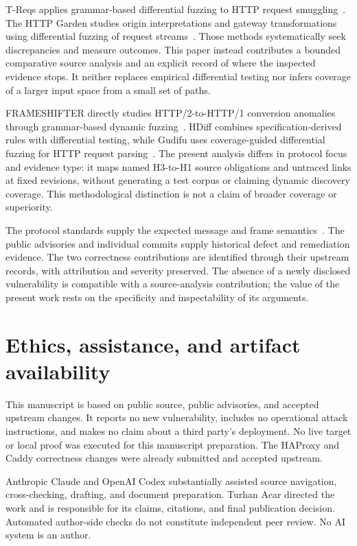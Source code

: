 \documentclass[11pt,letterpaper]{article}
\begin{document}
T-Reqs applies grammar-based differential fuzzing to HTTP request smuggling~\cite{treqs}. The HTTP Garden studies origin interpretations and gateway transformations using differential fuzzing of request streams~\cite{garden}. Those methods systematically seek discrepancies and measure outcomes. This paper instead contributes a bounded comparative source analysis and an explicit record of where the inspected evidence stops. It neither replaces empirical differential testing nor infers coverage of a larger input space from a small set of paths.

FRAMESHIFTER directly studies HTTP/2-to-HTTP/1 conversion anomalies through grammar-based dynamic fuzzing~\cite{frameshifter}. HDiff combines specification-derived rules with differential testing, while Gudifu uses coverage-guided differential fuzzing for HTTP request parsing~\cite{hdiff,gudifu}. The present analysis differs in protocol focus and evidence type: it maps named H3-to-H1 source obligations and untraced links at fixed revisions, without generating a test corpus or claiming dynamic discovery coverage. This methodological distinction is not a claim of broader coverage or superiority.

The protocol standards supply the expected message and frame semantics~\cite{rfc9112,rfc9114}. The public advisories and individual commits supply historical defect and remediation evidence. The two correctness contributions are identified through their upstream records, with attribution and severity preserved. The absence of a newly disclosed vulnerability is compatible with a source-analysis contribution; the value of the present work rests on the specificity and inspectability of its arguments.

\section{Ethics, assistance, and artifact availability}
This manuscript is based on public source, public advisories, and accepted upstream changes. It reports no new vulnerability, includes no operational attack instructions, and makes no claim about a third party's deployment. No live target or local proof was executed for this manuscript preparation. The HAProxy and Caddy correctness changes were already submitted and accepted upstream.

Anthropic Claude and OpenAI Codex substantially assisted source navigation, cross-checking, drafting, and document preparation. Turhan Acar directed the work and is responsible for its claims, citations, and final publication decision. Automated author-side checks do not constitute independent peer review. No AI system is an author.
\end{document}
